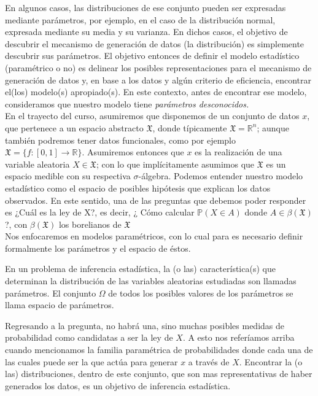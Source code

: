 En algunos casos, las distribuciones de ese conjunto pueden ser expresadas mediante parámetros, por ejemplo, en el caso de la distribución normal, expresada mediante su media y su varianza. En dichos casos, el objetivo  de descubrir el mecanismo de generación de datos (la distribución) es simplemente descubrir sus parámetros.  El objetivo entonces de definir el modelo estadístico (paramétrico o no) es delinear los posibles representaciones para el mecanismo de generación de datos y, en base a los datos y algún criterio de eficiencia, encontrar el(los) modelo(s) apropiado(s). En este contexto, antes de encontrar ese modelo, consideramos que nuestro modelo tiene \emph{parámetros desconocidos.}\\

En el trayecto del curso, asumiremos que disponemos de un conjunto de datos $x$, que pertenece a un espacio abstracto $\mathfrak{X}$, donde típicamente $\mathfrak{X} = \mathbb{R}^n$; aunque también podremos tener datos funcionales, como por ejemplo $\mathfrak{X} = \{f:[0,1]\rightarrow \mathbb{R} \}$. Asumiremos entonces  que $x$ es la realización de una variable aleatoria $X\in\mathfrak{X}$; con lo que implícitamente asumimos que $\mathfrak{X}$ es un espacio medible con su respectiva $\sigma$-álgebra. Podemos entender nuestro modelo estadístico como el espacio de posibles hipótesis que explican los datos observados. En este sentido, una de las preguntas que debemos poder responder es ¿Cuál es la ley de X?, es decir, ¿ Cómo calcular $\mathbb{P} (X\in A)$ donde $A \in \beta (\mathfrak{X})$?, con $\beta (\mathfrak{X})$ los borelianos de $\mathfrak{X}$\\

Nos enfocaremos en modelos paramétricos, con lo cual para es necesario definir formalmente los parámetros y el espacio de éstos.

\begin{definition} 
En un problema de inferencia estadística, la (o las) característica(s) que determinan la distribución de las variables aleatorias estudiadas son llamadas parámetros. El conjunto $\Omega$ de todos los posibles valores de los parámetros se llama espacio de parámetros.
\end{definition}

Regresando a la pregunta, no habrá una, sino muchas posibles medidas de probabilidad como candidatas a ser la ley de ${X}$. A esto nos referíamos arriba cuando mencionamos la familia paramétrica de probabilidades donde cada una de las cuales puede ser la que actúa para generar $x$ a través de ${X}$. Encontrar la (o las) distribuciones, dentro de este conjunto, que son mas representativas de haber generados los datos, es un objetivo de inferencia estadística. 


